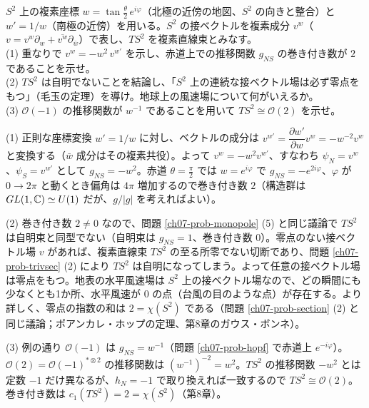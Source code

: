 \begin{problem}[難易度 B]\label{ch07-prob-ts2}
$S^2$ 上の複素座標 $w=\tan\frac\theta2\,e^{i\varphi}$（北極の近傍の地図、$S^2$ の向きと整合）と $w'=1/w$（南極の近傍）を用いる。$S^2$ の接ベクトルを複素成分 $v^w$（$v=v^w\partial_w+\overline{v^w}\partial_{\bar w}$）で表し、$TS^2$ を複素直線束とみなす。\\
(1) 重なりで $v^w=-w^2\,v^{w'}$ を示し、赤道上での推移関数 $g_{NS}$ の巻き付き数が $2$ であることを示せ。\\
(2) $TS^2$ は自明でないことを結論し、「$S^2$ 上の連続な接ベクトル場は必ず零点をもつ」（毛玉の定理）を導け。地球上の風速場について何がいえるか。\\
(3) $\mathcal O(-1)$ の推移関数が $w^{-1}$ であることを用いて $TS^2\cong\mathcal O(2)$ を示せ。
\end{problem}

\begin{solution}
(1) 正則な座標変換 $w'=1/w$ に対し、ベクトルの成分は $v^{w'}=\dfrac{\partial w'}{\partial w}v^w=-w^{-2}v^w$ と変換する（$\bar w$ 成分はその複素共役）。よって $v^w=-w^2v^{w'}$、すなわち $\psi_N=v^w$、$\psi_S=v^{w'}$ として $g_{NS}=-w^2$。赤道 $\theta=\frac\pi2$ では $w=e^{i\varphi}$ で $g_{NS}=-e^{2i\varphi}$、$\varphi$ が $0\to2\pi$ と動くとき偏角は $4\pi$ 増加するので巻き付き数 $2$（構造群は $GL(1,\mathbb{C})\simeq U(1)$ だが、$g/\lvert g\rvert$ を考えればよい）。

(2) 巻き付き数 $2\neq0$ なので、問題 \ref{ch07-prob-monopole} (5) と同じ議論で $TS^2$ は自明束と同型でない（自明束は $g_{NS}=1$、巻き付き数 $0$）。零点のない接ベクトル場 $v$ があれば、複素直線束 $TS^2$ の至る所零でない切断であり、問題 \ref{ch07-prob-trivsec} (2) により $TS^2$ は自明になってしまう。よって任意の接ベクトル場は零点をもつ。地表の水平風速場は $S^2$ 上の接ベクトル場なので、どの瞬間にも少なくとも1か所、水平風速が $0$ の点（台風の目のような点）が存在する。より詳しく、零点の指数の和は $2=\chi(S^2)$ である（問題 \ref{ch07-prob-section} (2) と同じ議論；ポアンカレ・ホップの定理、第8章のガウス・ボンネ）。

(3) 例の通り $\mathcal O(-1)$ は $g_{NS}=w^{-1}$（問題 \ref{ch07-prob-hopf} で赤道上 $e^{-i\varphi}$）。$\mathcal O(2)=\mathcal O(-1)^{*\otimes2}$ の推移関数は $(w^{-1})^{-2}=w^2$。$TS^2$ の推移関数 $-w^2$ とは定数 $-1$ だけ異なるが、$h_N=-1$ で取り換えれば一致するので $TS^2\cong\mathcal O(2)$。巻き付き数は $c_1(TS^2)=2=\chi(S^2)$（第8章）。
\end{solution}

